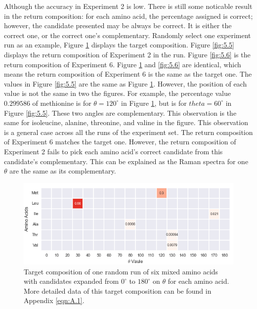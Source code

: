 Although the accuracy in Experiment 2 is low. There is still some noticable result in the return composition: for each amino acid, the percentage assigned is correct; however, the candidate presented may be always be correct. It is either the correct one, or the correct one's complementary. Randomly select one experiment run as an example, Figure \ref{fig:5.4} displays the target composition. Figure \ref{fig:5.5} displays the return composition of Experiment 2 in the run. Figure \ref{fig:5.6} is the return composition of Experiment 6. Figure \ref{fig:5.4} and \ref{fig:5.6} are identical, which means the return composition of Experiment 6 is the same as the target one. The values in Figure \ref{fig:5.5} are the same as Figure \ref{fig:5.4}. However, the position of each value is not the same in two the figures. For example, the percentage value $0.299586$ of methionine is for $\theta = 120^{\circ}$ in Figure \ref{fig:5.4}, but is for $theta = 60^{\circ}$ in Figure \ref{fig:5.5}. These two angles are complementary. This observation is the same for isoleucine, alanine, threonine, and valine in the figure. This observation is a general case across all the runs of the experiment set. The return composition of Experiment 6 matches the target one. However, the return composition of Experiment 2 fails to pick each amino acid's correct candidate from this candidate's complementary. This can be explained as the Raman spectra for one $\theta$ are the same as its complementary. \\

\begin{figure}[!ht] 
\centering
\includegraphics[scale=0.9]{Figures/mixture_target_composition_for_one_run_theta_0_180.png}
\caption{Target composition of one random run of six mixed amino acids with candidates expanded from $0^{\circ}$ to $180^{\circ}$ on $\theta$ for each amino acid. More detailed data of this target composition can be found in Appendix \ref{eqn:A.1}. } 
\label{fig:5.4}
\end{figure}

